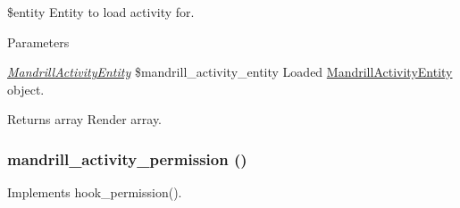 \$entity Entity to load activity for.


\begin{DoxyParams}{Parameters}
\item[{\em \hyperlink{classMandrillActivityEntity}{MandrillActivityEntity}}]\$mandrill\_\-activity\_\-entity Loaded \hyperlink{classMandrillActivityEntity}{MandrillActivityEntity} object.\end{DoxyParams}
\begin{DoxyReturn}{Returns}
array Render array. 
\end{DoxyReturn}
\hypertarget{mandrill__activity_8module_ae472153f930f2f774f26ae80f5b54eba}{
\subsubsection[{mandrill\_\-activity\_\-permission}]{\setlength{\rightskip}{0pt plus 5cm}mandrill\_\-activity\_\-permission ()}}
\label{mandrill__activity_8module_ae472153f930f2f774f26ae80f5b54eba}
Implements hook\_\-permission(). 